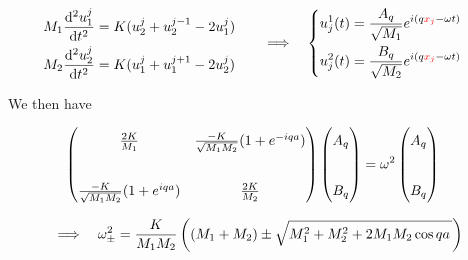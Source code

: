 \begin{frame}
  \begin{equation*}
    \begin{aligned}
      M_1 \frac{\mathrm{d}^2 u^{j}_1}{\mathrm{d}t^2} &= K (u^{j}_2 + u^{j-1}_2 - 2u^{j}_1) \cr
      M_2 \frac{\mathrm{d}^2 u^{j}_2}{\mathrm{d}t^2} &= K (u^{j}_1 + u^{j+1}_1 - 2u^{j}_2)
    \end{aligned}
    \quad \Longrightarrow \quad%
    \left\{
    \begin{aligned}
      u_{j}^1(t) &= \frac{A_q}{\sqrt{M_1}} e^{i(q\mathcolor{red}{x_j} - \omega t)} \cr
      u_{j}^2(t) &= \frac{B_q}{\sqrt{M_2}} e^{i(q\mathcolor{red}{x_j} - \omega t)} \cr
    \end{aligned}
    \right.
  \end{equation*}

  We then have

    \begin{equation*}
      \begin{aligned}
        \begin{pmatrix}
            \renewcommand*{\arraystretch}{1.5}
            \frac{2K}{M_1} & \frac{-K}{\sqrt{M_1M_2}}(1+e^{-iqa}) \\
            \phantom{.} \\
            \frac{-K}{\sqrt{M_1M_2}}(1+e^{iqa}) & \frac{2K}{M_2}
        \end{pmatrix}
        \begin{pmatrix}
        A_q \\
        \phantom{a} \\
        B_q 
        \end{pmatrix}
        &=
        \omega^2
        \begin{pmatrix}
        A_q \\
        \phantom{a} \\
        B_q 
        \end{pmatrix}
      \end{aligned}
    \end{equation*}
    
    \medskip
    \begin{equation*}
      \Longrightarrow \quad \omega_\pm^2 = {K\over M_1M_2} \left((M_1 + M_2) \pm \sqrt{M_1^2 + M_2^2 + 2M_1M_2\cos{qa}\,}\right)
    \end{equation*}
\end{frame}